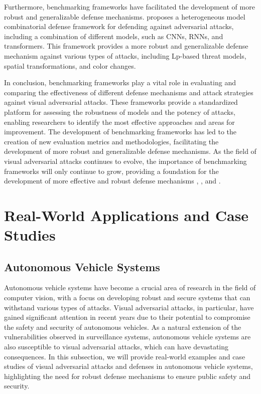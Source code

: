 \documentclass[11pt]{article}
\begin{document}
Furthermore, benchmarking frameworks have facilitated the development of more robust and generalizable defense mechanisms. \cite{ref178} proposes a heterogeneous model combinatorial defense framework for defending against adversarial attacks, including a combination of different models, such as CNNs, RNNs, and transformers. This framework provides a more robust and generalizable defense mechanism against various types of attacks, including Lp-based threat models, spatial transformations, and color changes.

In conclusion, benchmarking frameworks play a vital role in evaluating and comparing the effectiveness of different defense mechanisms and attack strategies against visual adversarial attacks. These frameworks provide a standardized platform for assessing the robustness of models and the potency of attacks, enabling researchers to identify the most effective approaches and areas for improvement. The development of benchmarking frameworks has led to the creation of new evaluation metrics and methodologies, facilitating the development of more robust and generalizable defense mechanisms. As the field of visual adversarial attacks continues to evolve, the importance of benchmarking frameworks will only continue to grow, providing a foundation for the development of more effective and robust defense mechanisms \cite{ref179}, \cite{ref180}, and \cite{ref181}.

\section{Real-World Applications and Case Studies}

\subsection{Autonomous Vehicle Systems}

Autonomous vehicle systems have become a crucial area of research in the field of computer vision, with a focus on developing robust and secure systems that can withstand various types of attacks. Visual adversarial attacks, in particular, have gained significant attention in recent years due to their potential to compromise the safety and security of autonomous vehicles. As a natural extension of the vulnerabilities observed in surveillance systems, autonomous vehicle systems are also susceptible to visual adversarial attacks, which can have devastating consequences. In this subsection, we will provide real-world examples and case studies of visual adversarial attacks and defenses in autonomous vehicle systems, highlighting the need for robust defense mechanisms to ensure public safety and security.
\end{document}
